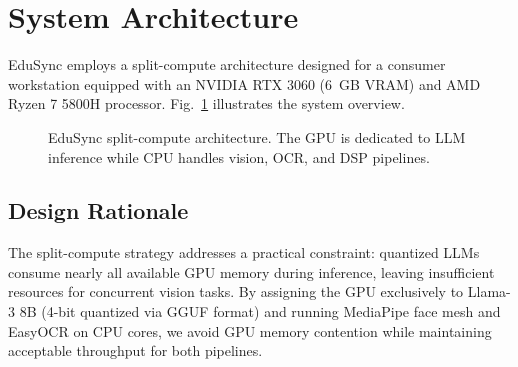 \documentclass[conference]{IEEEtran}
\begin{document}
\section{System Architecture}
\label{sec:architecture}

EduSync employs a split-compute architecture designed for a consumer workstation equipped with an NVIDIA RTX 3060 (6~GB VRAM) and AMD Ryzen 7 5800H processor. Fig.~\ref{fig:architecture} illustrates the system overview.

\begin{figure}[htbp]
\centering
{}
\caption{EduSync split-compute architecture. The GPU is dedicated to LLM inference while CPU handles vision, OCR, and DSP pipelines.}
\label{fig:architecture}
\end{figure}

\subsection{Design Rationale}

The split-compute strategy addresses a practical constraint: quantized LLMs consume nearly all available GPU memory during inference, leaving insufficient resources for concurrent vision tasks. By assigning the GPU exclusively to Llama-3 8B (4-bit quantized via GGUF format) and running MediaPipe face mesh and EasyOCR on CPU cores, we avoid GPU memory contention while maintaining acceptable throughput for both pipelines.
\end{document}
